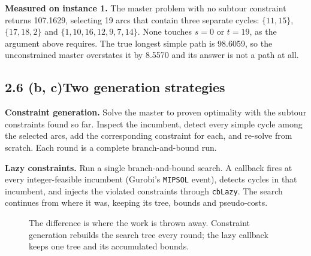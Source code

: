 \documentclass[11pt]{article}
\begin{document}
\textbf{Measured on instance 1.}\quad
The master problem with no subtour constraint returns 107.1629,
selecting 19 arcs that contain three separate cycles: $\{11,15\}$,
$\{17,18,2\}$ and $\{1,10,16,12,9,7,14\}$. None touches $s = 0$ or
$t = 19$, as the argument above requires. The true longest simple path
is 98.6059, so the unconstrained master overstates it by 8.5570 and its
answer is not a path at all.

\subsection*{2.6 (b, c)\quad Two generation strategies}

\textbf{Constraint generation.}\quad
Solve the master to proven optimality with the subtour constraints found
so far. Inspect the incumbent, detect every simple cycle among the
selected arcs, add the corresponding constraint for each, and re-solve
from scratch. Each round is a complete branch-and-bound run.

\textbf{Lazy constraints.}\quad
Run a single branch-and-bound search. A callback fires at every
integer-feasible incumbent (Gurobi's \texttt{MIPSOL} event), detects
cycles in that incumbent, and injects the violated constraints through
\texttt{cbLazy}. The search continues from where it was, keeping its
tree, bounds and pseudo-costs.

\begin{figure}[htbp]
\centering
{}
\caption{The difference is where the work is thrown away. Constraint
generation rebuilds the search tree every round; the lazy callback keeps
one tree and its accumulated bounds.}
\end{figure}
\end{document}
